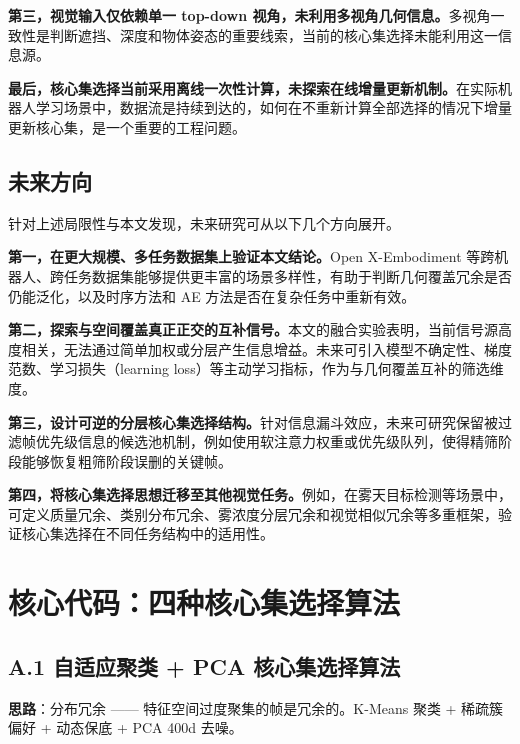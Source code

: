 \documentclass[12pt,a4paper]{article}
\begin{document}
\textbf{第三，视觉输入仅依赖单一 top-down 视角，未利用多视角几何信息。}多视角一致性是判断遮挡、深度和物体姿态的重要线索，当前的核心集选择未能利用这一信息源。

\textbf{最后，核心集选择当前采用离线一次性计算，未探索在线增量更新机制。}在实际机器人学习场景中，数据流是持续到达的，如何在不重新计算全部选择的情况下增量更新核心集，是一个重要的工程问题。

\subsection{未来方向}

针对上述局限性与本文发现，未来研究可从以下几个方向展开。

\textbf{第一，在更大规模、多任务数据集上验证本文结论。}Open X-Embodiment 等跨机器人、跨任务数据集能够提供更丰富的场景多样性，有助于判断几何覆盖冗余是否仍能泛化，以及时序方法和 AE 方法是否在复杂任务中重新有效。

\textbf{第二，探索与空间覆盖真正正交的互补信号。}本文的融合实验表明，当前信号源高度相关，无法通过简单加权或分层产生信息增益。未来可引入模型不确定性、梯度范数、学习损失（learning loss）等主动学习指标，作为与几何覆盖互补的筛选维度。

\textbf{第三，设计可逆的分层核心集选择结构。}针对信息漏斗效应，未来可研究保留被过滤帧优先级信息的候选池机制，例如使用软注意力权重或优先级队列，使得精筛阶段能够恢复粗筛阶段误删的关键帧。

\textbf{第四，将核心集选择思想迁移至其他视觉任务。}例如，在雾天目标检测等场景中，可定义质量冗余、类别分布冗余、雾浓度分层冗余和视觉相似冗余等多重框架，验证核心集选择在不同任务结构中的适用性。

\newpage
\appendix
\section{核心代码：四种核心集选择算法}
\label{app:code}

\subsection{A.1 自适应聚类 + PCA 核心集选择算法}

\textbf{思路}：分布冗余 —— 特征空间过度聚集的帧是冗余的。K-Means 聚类 + 稀疏簇偏好 + 动态保底 + PCA 400d 去噪。
\end{document}
